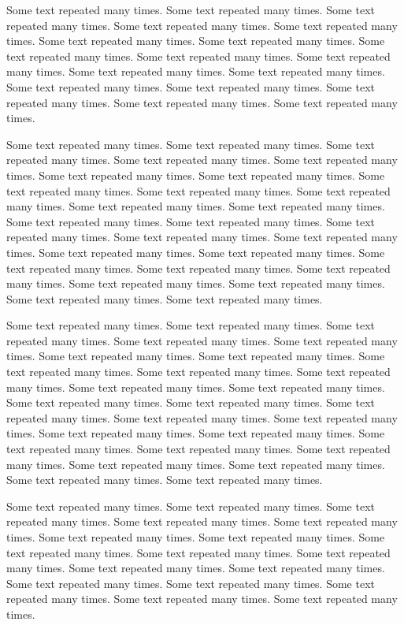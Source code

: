 Some text repeated many times. Some text repeated many times. Some text repeated many times. Some text repeated many times. Some text repeated many times. Some text repeated many times. Some text repeated many times. Some text repeated many times. Some text repeated many times. Some text repeated many times. Some text repeated many times. Some text repeated many times. Some text repeated many times. Some text repeated many times. Some text repeated many times. Some text repeated many times. Some text repeated many times. 

Some text repeated many times. Some text repeated many times. Some text repeated many times. Some text repeated many times. Some text repeated many times. Some text repeated many times. Some text repeated many times. Some text repeated many times. Some text repeated many times. Some text repeated many times. Some text repeated many times. Some text repeated many times. Some text repeated many times. Some text repeated many times. Some text repeated many times. Some text repeated many times. Some text repeated many times. Some text repeated many times. Some text repeated many times. Some text repeated many times. Some text repeated many times. Some text repeated many times. Some text repeated many times. Some text repeated many times. Some text repeated many times. Some text repeated many times. 

Some text repeated many times. Some text repeated many times. Some text repeated many times. Some text repeated many times. Some text repeated many times. Some text repeated many times. Some text repeated many times. Some text repeated many times. Some text repeated many times. Some text repeated many times. Some text repeated many times. Some text repeated many times. Some text repeated many times. Some text repeated many times. Some text repeated many times. Some text repeated many times. Some text repeated many times. Some text repeated many times. Some text repeated many times. Some text repeated many times. Some text repeated many times. Some text repeated many times. Some text repeated many times. Some text repeated many times. Some text repeated many times. Some text repeated many times. 


Some text repeated many times. Some text repeated many times. Some text repeated many times. Some text repeated many times. Some text repeated many times. Some text repeated many times. Some text repeated many times. Some text repeated many times. Some text repeated many times. Some text repeated many times. Some text repeated many times. Some text repeated many times. Some text repeated many times. Some text repeated many times. Some text repeated many times. Some text repeated many times. Some text repeated many times. 

